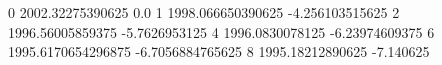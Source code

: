 0 2002.32275390625 0.0
1 1998.066650390625 -4.256103515625
2 1996.56005859375 -5.7626953125
4 1996.0830078125 -6.23974609375
6 1995.6170654296875 -6.7056884765625
8 1995.18212890625 -7.140625
